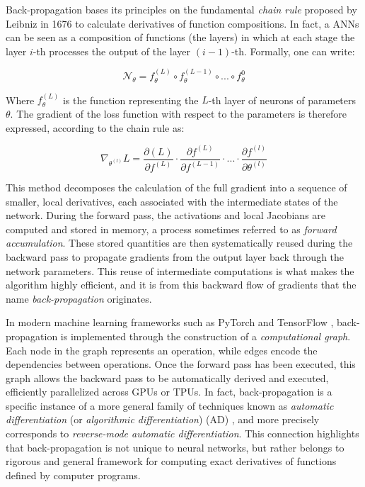 Back-propagation bases its principles on the fundamental \textit{chain rule} proposed by Leibniz in 1676 to calculate 
derivatives of function compositions. In fact, a ANNs can be seen as a composition of functions (the layers) in which 
at each stage the layer $i$-th processes the output of the layer $(i-1)$-th. Formally, one can write: 

\begin{equation}
    \mathcal{N}_{\theta} = f_\theta^{(L)} \circ f_\theta^{(L-1)} \circ ... \circ f_\theta^{0}
    \label{eq:composition}
\end{equation}

Where $f_\theta^{(L)}$ is the function representing the $L$-th layer of neurons of parameters $\theta$. The gradient 
of the loss function with respect to the parameters is therefore expressed, according to the chain rule as: 

\begin{equation}
    \nabla_{\theta^{(l)}} L  = \frac{\partial{(L)}}{\partial{f^{(L)}}} \cdot \frac{\partial{f^{(L)}}}{\partial{f^{(L-1)}}} 
    \cdot ... \cdot \frac{\partial{f^{(l)}}}{\partial{\theta^{(l)}}}
    \label{eq:chain_rule}
\end{equation}

This method decomposes the calculation of the full gradient into a sequence of smaller, local derivatives, each 
associated with the intermediate states of the network. During the forward pass, the activations and local 
Jacobians are computed and stored in memory, a process sometimes referred to as \textit{forward accumulation}. 
These stored quantities are then systematically reused during the backward pass to propagate gradients from the 
output layer back through the network parameters. This reuse of intermediate computations is what makes the 
algorithm highly efficient, and it is from this backward flow of gradients that the name \textit{back-propagation} 
originates.  

In modern machine learning frameworks such as PyTorch \cite{paszke2019pytorch} and TensorFlow 
\cite{abadi2016tensorflow}, back-propagation is implemented through the construction of a 
\textit{computational graph}. Each node in the graph represents an operation, while edges encode the dependencies 
between operations. Once the forward pass has been executed, this graph allows the backward pass to be automatically 
derived and executed, efficiently parallelized across GPUs or TPUs. In fact, back-propagation is a specific instance 
of a more general family of techniques known as \textit{automatic differentiation} (or \textit{algorithmic 
differentiation}) (AD) \cite{Griewank2000EvaluatingD, baydin2018}, and more precisely corresponds to 
\textit{reverse-mode automatic differentiation}. This connection highlights that back-propagation is not 
unique to neural networks, but rather belongs to rigorous and general framework for computing exact 
derivatives of functions defined by computer programs.  

